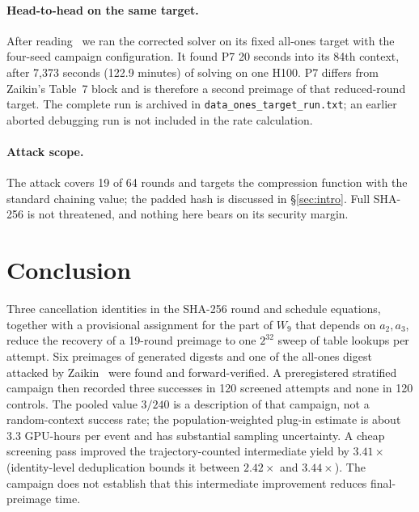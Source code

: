 \documentclass[11pt,a4paper]{article}
\begin{document}
\paragraph{Head-to-head on the same target.}
After reading~\cite{Zaikin2026} we ran the corrected solver on its fixed
all-ones target with the four-seed campaign configuration.  It found P7
20 seconds into its 84th context, after 7{,}373 seconds (122.9 minutes) of
solving on one H100.  P7 differs from Zaikin's Table~7 block and is therefore
a second preimage of that reduced-round target.  The complete run is archived
in \texttt{data\_ones\_target\_run.txt}; an earlier aborted debugging run is
not included in the rate calculation.

\paragraph{Attack scope.}
The attack covers 19 of 64 rounds and targets the compression function
with the standard chaining value; the padded hash is discussed in
\S\ref{sec:intro}.  Full SHA-256 is not threatened, and nothing here bears
on its security margin.

\section{Conclusion}
\label{sec:conclusion}

Three cancellation identities in the SHA-256 round and schedule equations,
together with a provisional assignment for the part of $W_9$ that depends
on $a_2,a_3$, reduce the recovery of a 19-round preimage to one $2^{32}$
sweep of table lookups per attempt.  Six preimages of generated digests and
one of the all-ones digest attacked by Zaikin~\cite{Zaikin2026} were found
and forward-verified.  A preregistered stratified campaign then recorded
three successes in 120 screened attempts and none in 120 controls.  The
pooled value $3/240$ is a description of that campaign, not a
random-context success rate; the population-weighted plug-in estimate is
about 3.3 GPU-hours per event and has substantial sampling uncertainty.  A
cheap screening pass improved the trajectory-counted intermediate yield by
$3.41\times$ (identity-level deduplication bounds it between $2.42\times$
and $3.44\times$).  The campaign does not establish that this intermediate
improvement reduces final-preimage time.
\end{document}
